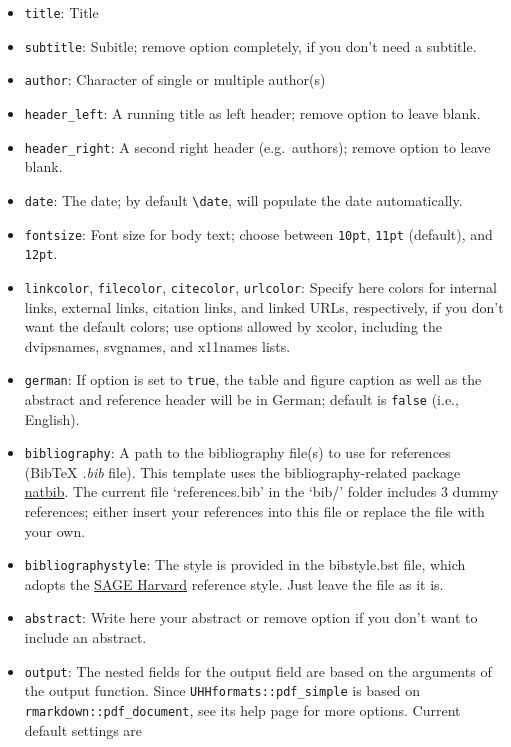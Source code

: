 \documentclass[
11pt,
a4paper]{article}
\providecommand{\tightlist}{%
  \setlength{\itemsep}{0pt}\setlength{\parskip}{0pt}}
\begin{document}
\begin{itemize}
\tightlist
\item
  \texttt{title}: Title
\item
  \texttt{subtitle}: Subitle; remove option completely, if you don't
  need a subtitle.
\item
  \texttt{author}: Character of single or multiple author(s)
\item
  \texttt{header\_left}: A running title as left header; remove option
  to leave blank.
\item
  \texttt{header\_right}: A second right header (e.g.~authors); remove
  option to leave blank.
\item
  \texttt{date}: The date; by default \texttt{\textbackslash{}date},
  will populate the date automatically.
\item
  \texttt{fontsize}: Font size for body text; choose between
  \texttt{10pt}, \texttt{11pt} (default), and \texttt{12pt}.
\item
  \texttt{linkcolor}, \texttt{filecolor}, \texttt{citecolor},
  \texttt{urlcolor}: Specify here colors for internal links, external
  links, citation links, and linked URLs, respectively, if you don't
  want the default colors; use options allowed by xcolor, including the
  dvipsnames, svgnames, and x11names lists.
\item
  \texttt{german}: If option is set to \texttt{true}, the table and
  figure caption as well as the abstract and reference header will be in
  German; default is \texttt{false} (i.e., English).
\item
  \texttt{bibliography}: A path to the bibliography file(s) to use for
  references (BibTeX \emph{.bib} file). This template uses the
  bibliography-related package
  \href{https://ctan.org/pkg/natbib}{natbib}. The current file
  `references.bib' in the `bib/' folder includes 3 dummy references;
  either insert your references into this file or replace the file with
  your own.
\item
  \texttt{bibliographystyle}: The style is provided in the bibstyle.bst
  file, which adopts the
  \href{https://uk.sagepub.com/sites/default/files/sage_harvard_reference_style_0.pdf}{SAGE
  Harvard} reference style. Just leave the file as it is.
\item
  \texttt{abstract}: Write here your abstract or remove option if you
  don't want to include an abstract.
\item
  \texttt{output}: The nested fields for the output field are based on
  the arguments of the output function. Since
  \texttt{UHHformats::pdf\_simple} is based on
  \texttt{rmarkdown::pdf\_document}, see its help page for more options.
  Current default settings are


\end{itemize}
\end{document}
